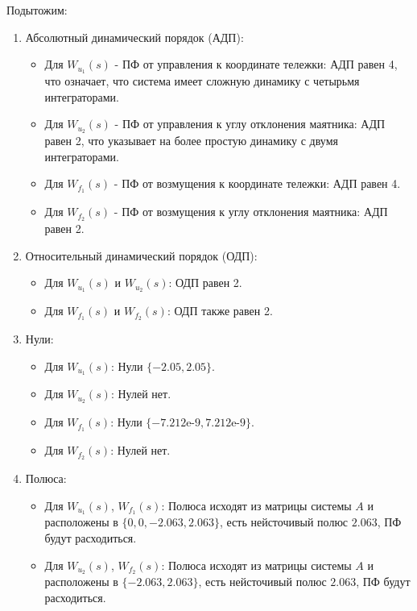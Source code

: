 Подытожим:
\begin{enumerate}
    \item Абсолютный динамический порядок (АДП):
        \begin{itemize}
            \item Для $W_{u_1}(s)$ - ПФ от управления к координате тележки: АДП равен 4, 
            что означает, что система имеет сложную динамику с четырьмя интеграторами.
            \item Для $W_{u_2}(s)$ - ПФ от управления к углу отклонения маятника: АДП равен 2, 
            что указывает на более простую динамику с двумя интеграторами.
            \item Для $W_{f_1}(s)$ - ПФ от возмущения к координате тележки: АДП равен 4.
            \item Для $W_{f_2}(s)$ - ПФ от возмущения к углу отклонения маятника: АДП равен 2.
        \end{itemize}
    \item Относительный динамический порядок (ОДП):
        \begin{itemize}
            \item Для $W_{u_1}(s)$ и $W_{u_2}(s)$: ОДП равен 2.
            \item Для $W_{f_1}(s)$ и $W_{f_2}(s)$: ОДП также равен 2.
        \end{itemize}
    \item Нули:
        \begin{itemize}
            \item Для $W_{u_1}(s)$: Нули $\{-2.05, 2.05\}$.
            \item Для $W_{u_2}(s)$: Нулей нет.
            \item Для $W_{f_1}(s)$: Нули $\{-\text{7.212e-9}, \text{7.212e-9}\}$.
            \item Для $W_{f_2}(s)$: Нулей нет.
        \end{itemize}
    \item Полюса:
        \begin{itemize}
            \item Для $W_{u_1}(s)$, $W_{f_1}(s)$: Полюса исходят из матрицы системы $A$ и расположены в $\{0, 0, -2.063, 2.063\}$, 
            есть нейсточивый полюс $2.063$, ПФ будут расходиться.
            \item Для  $W_{u_2}(s)$,  $W_{f_2}(s)$: Полюса исходят из матрицы системы $A$ и расположены в $\{-2.063, 2.063\}$, 
            есть нейсточивый полюс $2.063$, ПФ будут расходиться.
        \end{itemize}
\end{enumerate}


